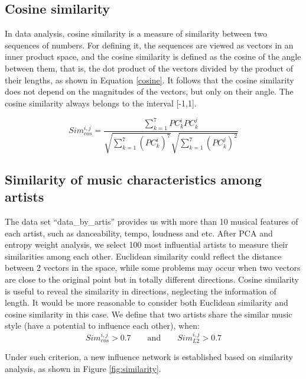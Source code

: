 \subsection{Cosine similarity}

In data analysis, cosine similarity is a measure of similarity between two sequences of numbers. For defining it, the sequences are viewed as vectors in an inner product space, and the cosine similarity is defined as the cosine of the angle between them, that is, the dot product of the vectors divided by the product of their lengths, as shown in Equation \eqref{cosine}. It follows that the cosine similarity does not depend on the magnitudes of the vectors, but only on their angle. The cosine similarity always belongs to the interval [-1,1]. 

\begin{equation}
Sim_{cos}^{i, j}=\frac{\sum_{k=1}^{7} P C_{k}^{i} P C_{k}^{j}}{\sqrt{\sum_{k=1}^{7}\left(P C_{k}^{i}\right)^{7}} \sqrt{\sum_{k=1}^{7}\left(P C_{k}^{j}\right)^{2}}}
\label{cosine}
\end{equation}

\subsection{Similarity of music characteristics among artists}

The data set ``data\_by\_artis'' provides us with more than 10 musical features of each artist, such as danceability, tempo, loudness and etc. After PCA and entropy weight analysis, we select 100 most influential artists to measure their similarities among each other. Euclidean similarity could reflect the distance between 2 vectors in the space, while some problems may occur when two vectors are close to the original point but in totally different directions. Cosine similarity is useful to reveal the similarity in directions, neglecting the information of length. It would be more reasonable to consider both Euclidean similarity and cosine similarity in this case. We define that two artists share the similar music style (have a potential to influence each other), when:
\begin {equation}
Sim_{cos}^{i, j}>0.7 \qquad \text{and} \qquad Sim_{L2}^{i,j}>0.7
\end{equation}

Under such criterion, a new influence network is established based on similarity analysis, as shown in Figure \ref{fig:similarity}.

